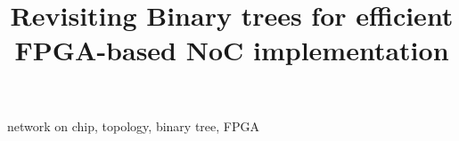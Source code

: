 \documentclass[conference,10pt,a4paper]{IEEEtran}
\begin{document}
\title{Revisiting Binary trees for efficient FPGA-based NoC implementation}

\maketitle



\begin{IEEEkeywords}
network on chip, topology, binary tree, FPGA
\end{IEEEkeywords}










 
\end{document}
